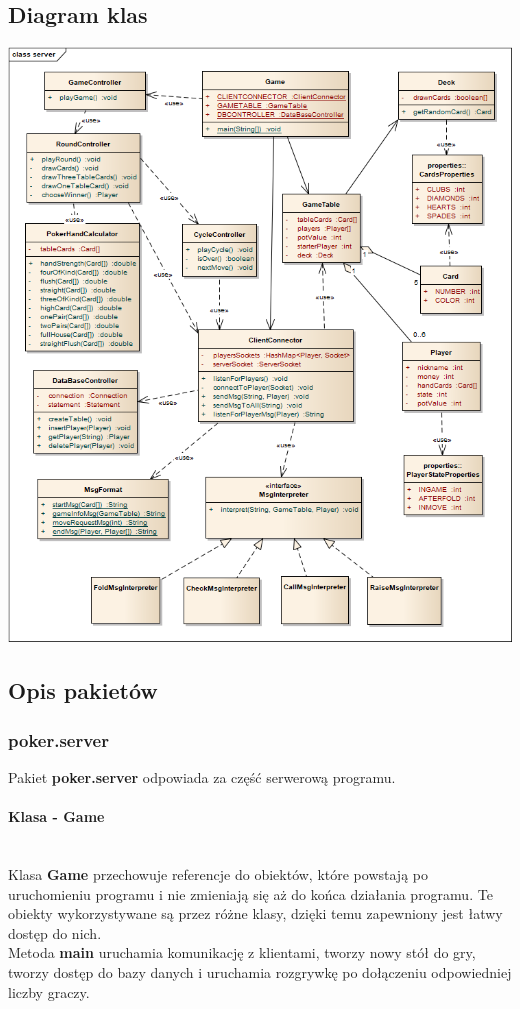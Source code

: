 \documentclass{article}
\newcommand{\mparagraph}[1]{\paragraph{#1}\mbox{}\vspace{2mm}\\}
\begin{document}
    \subsection{Diagram klas}
        \begin{center}
            \includegraphics[width=\textwidth]{class_server.png}
        \end{center}
    
    \subsection{Opis pakietów}
        \subsubsection{poker.server}
            Pakiet \textbf{poker.server} odpowiada za część serwerową programu.
        
            \mparagraph{Klasa - Game}
                Klasa \textbf{Game} przechowuje referencje do obiektów, które powstają po uruchomieniu programu i nie zmieniają się aż do końca działania programu.
                Te obiekty wykorzystywane są przez różne klasy, dzięki temu zapewniony jest łatwy dostęp do nich.
                \\
                Metoda \textbf{main} uruchamia komunikację z klientami, tworzy nowy stół do gry, tworzy dostęp do bazy danych i uruchamia rozgrywkę po dołączeniu odpowiedniej liczby graczy.
            
\end{document}
